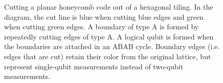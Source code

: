 \documentclass[onecolumn,a4paper,accepted=2022-09-12]{quantumarticle}
\theoremstyle{definition}
\theoremstyle{definition}
\theoremstyle{definition}
\begin{document}
\begin{figure}[ht!]
    \centering
    \caption{
    Cutting a planar honeycomb code out of a hexagonal tiling.
    In the diagram, the cut line is blue when cutting blue edges and green when cutting green edges.
    A boundary of type A is formed by repeatedly cutting edges of type A.
    A logical qubit is formed when the boundaries are attached in an ABAB cycle.
    Boundary edges (i.e. edges that are cut) retain their color from the original lattice, but represent single-qubit measurements instead of two-qubit measurements.
    }
    \label{fig:cut_out_patch}
\end{figure}
\end{document}
